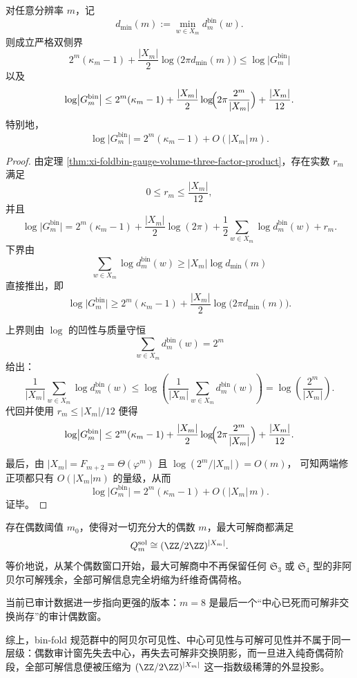 \begin{theorem}\label{thm:xi-foldbin-gauge-volume-kappa-two-sided-compression}
对任意分辨率 \(m\)，记
\[
d_{\min}(m):=\min_{w\in X_m}d_m^{\mathrm{bin}}(w).
\]
则成立严格双侧界
\[
2^m(\kappa_m-1)
+\frac{|X_m|}{2}\log\!\bigl(2\pi d_{\min}(m)\bigr)
\le
\log\bigl|G_m^{\mathrm{bin}}\bigr|
\]
以及
\[
\log\bigl|G_m^{\mathrm{bin}}\bigr|
\le
2^m(\kappa_m-1)
+\frac{|X_m|}{2}\log\!\Bigl(2\pi\frac{2^m}{|X_m|}\Bigr)
+\frac{|X_m|}{12}.
\]
特别地，
\[
\log\bigl|G_m^{\mathrm{bin}}\bigr|
=
2^m(\kappa_m-1)+O(|X_m|\,m).
\]
\end{theorem}
\begin{proof}
由定理 \ref{thm:xi-foldbin-gauge-volume-three-factor-product}，存在实数 \(r_m\) 满足
\[
0\le r_m\le \frac{|X_m|}{12},
\]
并且
\[
\log\bigl|G_m^{\mathrm{bin}}\bigr|
=
2^m(\kappa_m-1)
+\frac{|X_m|}{2}\log(2\pi)
+\frac12\sum_{w\in X_m}\log d_m^{\mathrm{bin}}(w)
+r_m.
\]
下界由
\[
\sum_{w\in X_m}\log d_m^{\mathrm{bin}}(w)
\ge
|X_m|\log d_{\min}(m)
\]
直接推出，即
\[
\log\bigl|G_m^{\mathrm{bin}}\bigr|
\ge
2^m(\kappa_m-1)
+\frac{|X_m|}{2}\log\!\bigl(2\pi d_{\min}(m)\bigr).
\]

上界则由 \(\log\) 的凹性与质量守恒
\[
\sum_{w\in X_m}d_m^{\mathrm{bin}}(w)=2^m
\]
给出：
\[
\frac1{|X_m|}
\sum_{w\in X_m}\log d_m^{\mathrm{bin}}(w)
\le
\log\!\left(
\frac1{|X_m|}
\sum_{w\in X_m}d_m^{\mathrm{bin}}(w)
\right)
=
\log\!\left(\frac{2^m}{|X_m|}\right).
\]
代回并使用
\(
r_m\le |X_m|/12
\)
便得
\[
\log\bigl|G_m^{\mathrm{bin}}\bigr|
\le
2^m(\kappa_m-1)
+\frac{|X_m|}{2}\log\!\Bigl(2\pi\frac{2^m}{|X_m|}\Bigr)
+\frac{|X_m|}{12}.
\]

最后，由
\(
|X_m|=F_{m+2}=\Theta(\varphi^m)
\)
且
\(
\log(2^m/|X_m|)=O(m)
\)，
可知两端修正项都只有 \(O(|X_m|m)\) 的量级，从而
\[
\log\bigl|G_m^{\mathrm{bin}}\bigr|
=
2^m(\kappa_m-1)+O(|X_m|\,m).
\]
证毕。
\end{proof}

\begin{conjecture}[可解阴影的最终纯奇偶荷化]\label{conj:xi-foldbin-solvable-shadow-eventual-pure-parity}
存在偶数阈值 \(m_0\)，使得对一切充分大的偶数 \(m\)，最大可解商都满足
\[
Q_m^{\mathrm{sol}}
\cong
(\ZZ/2\ZZ)^{|X_m|}.
\]
等价地说，从某个偶数窗口开始，最大可解商中不再保留任何
\(
\mathfrak S_3
\)
或
\(
\mathfrak S_4
\)
型的非阿贝尔可解残余，全部可解信息完全坍缩为纤维奇偶荷格。

当前已审计数据进一步指向更强的版本：\(m=8\) 是最后一个“中心已死而可解非交换尚存”的审计偶数窗。
\end{conjecture}

综上，bin-fold 规范群中的阿贝尔可见性、中心可见性与可解可见性并不属于同一层级：偶数审计窗先失去中心，再失去可解非交换阴影，而一旦进入纯奇偶荷阶段，全部可解信息便被压缩为
\(
(\ZZ/2\ZZ)^{|X_m|}
\)
这一指数级稀薄的外显投影。

\endinput
